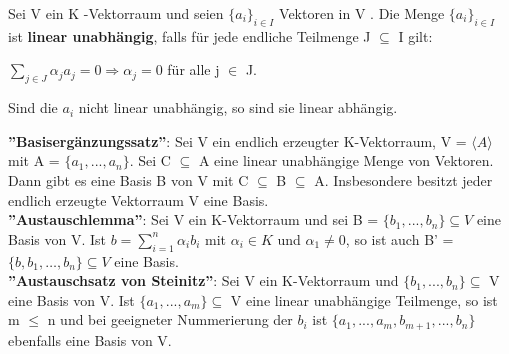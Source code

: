 \begin{definition}
Sei V ein K -Vektorraum und seien $\{a_i \}_{i \in I}$ Vektoren in V . Die Menge $\{a_i\}_{i \in I}$ ist \textbf{linear unabhängig}, falls für jede endliche Teilmenge J $\subseteq$ I gilt:
\begin{center}
$\sum\nolimits_{j \in J} \alpha_j a_j = 0 \Rightarrow \alpha_j = 0$ für alle j $\in$ J.
\end{center}
Sind die $a_i$ nicht linear unabhängig, so sind sie linear abhängig.
\end{definition}

\textbf{”Basisergänzungssatz”}: Sei V ein endlich erzeugter K-Vektorraum, V = $\langle A \rangle$ mit A = $\{a_1,... ,a_n\}$. Sei C $\subseteq$ A eine linear unabhängige Menge von Vektoren. Dann gibt es eine Basis B von V mit C $\subseteq$ B $\subseteq$ A. Insbesondere besitzt jeder endlich erzeugte Vektorraum V eine Basis.\\

\textbf{”Austauschlemma”}: Sei V ein K-Vektorraum und sei B = $\{b_1,... ,b_n\} \subseteq V$ eine Basis von V. Ist $b= \sum\nolimits_{i=1}^{n} \alpha_i b_i$ mit $\alpha_i \in K$ und $\alpha_1 \neq 0$, so ist auch B' = $\{ b, b_1, …, b_n \} \subseteq V$ eine Basis.\\

\textbf{”Austauschsatz von Steinitz”}: Sei V ein K-Vektorraum und $\{b_1,... ,b_n\} \subseteq$ V eine Basis von V. Ist $\{a_1,... ,a_m\} \subseteq$ V eine linear unabhängige Teilmenge, so ist m $\le$ n und bei geeigneter Nummerierung der $b_i$ ist $\{a_1,... ,a_m, b_{m+1},... ,b_n\}$ ebenfalls eine Basis von V.


